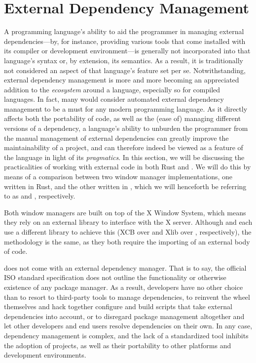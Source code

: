 \section{External Dependency Management}

A programming language's ability to aid the programmer in managing external
dependencies---by, for instance, providing various tools that come installed
with its compiler or development environment---is generally not incorporated
into that language's syntax or, by extension, its semantics. As a result, it is
traditionally not considered an aspect of that language's feature set per se.
Notwithstanding, external dependency management is more and more becoming an
appreciated addition to the \textit{ecosystem} around a language, especially
so for compiled languages. In fact, many would consider automated external
dependency management to be a must for any modern programming language. As
it directly affects both the portability of code, as well as the (ease of)
managing different versions of a dependency, a language's ability to unburden
the programmer from the manual management of external dependencies can greatly
improve the maintainability of a project, and can therefore indeed be viewed as
a feature of the language in light of its \textit{pragmatics}. In this section,
we will be discussing the practicalities of working with external code in both
Rust and \cpp. We will do this by means of a comparison between two window
manager implementations, one written in Rust, and the other written in \cpp,
which we will henceforth be referring to as \wmrs and \wmcpp, respectively.

Both window managers are built on top of the X Window System, which means
they rely on an external library to interface with the X server\cite{x11}.
Although \wmrs and \wmcpp each use a different library to achieve this (XCB over
\cite{xcb} and Xlib over \cite{xlib}, respectively), the
methodology is the same, as they both require the importing of an external body
of code.


\cpp does not come with an external dependency manager. That is to say, the
official ISO standard \cpp specification\cite{cppstd} does not outline the
functionality or otherwise existence of any package manager. As a result,
developers have no other choice than to resort to third-party tools to manage
dependencies, to reinvent the wheel themselves and hack together configure and
build scripts that take external dependencies into account, or to disregard
package management altogether and let other developers and end users resolve
dependencies on their own. In any case, \cpp dependency management is complex,
and the lack of a standardized tool inhibits the adoption of \cpp projects, as
well as their portability to other platforms and development environments.

